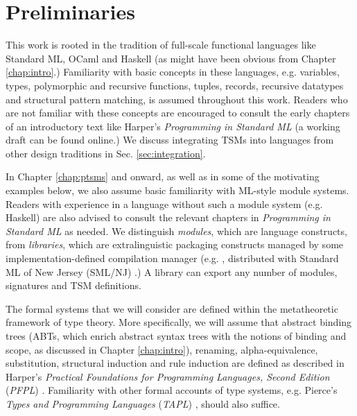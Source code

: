 
\section{Preliminaries}\label{sec:preliminaries}
\vspace{-3px}
This work is rooted in the tradition of full-scale functional languages like Standard ML, OCaml and Haskell (as might have been obvious from Chapter \ref{chap:intro}.) Familiarity with basic concepts in these languages, e.g. variables, types, polymorphic and recursive functions, tuples, records, recursive datatypes and structural pattern matching, is assumed throughout this work. Readers who are not familiar with these concepts are encouraged to consult the early chapters of an introductory text like Harper's \emph{Programming in Standard ML} \cite{harper1997programming} (a working draft can be found online.) We discuss integrating TSMs into languages from other design traditions in Sec. \ref{sec:integration}.

In Chapter \ref{chap:ptsms} and onward, as well as in some of the motivating examples below, we also assume basic familiarity with ML-style module systems. Readers with experience in a language without such a module system (e.g. Haskell) are also advised to consult the relevant chapters in \emph{Programming in Standard ML} \cite{harper1997programming} as needed. We distinguish \emph{modules}, which are language constructs, from \emph{libraries}, which are extralinguistic packaging constructs managed by some implementation-defined compilation manager (e.g. , distributed with Standard ML of New Jersey (SML/NJ) \cite{DBLP:conf/plilp/AppelM91}.) A library can export any number of modules, signatures and TSM definitions.

The formal systems that we will consider are defined within the metatheoretic framework of type theory. More specifically, we will assume that abstract binding trees (ABTs, which enrich abstract syntax trees with the notions of binding and scope, as discussed in Chapter \ref{chap:intro}), renaming, alpha-equivalence, substitution, structural induction and rule induction are defined as described in Harper's \emph{Practical Foundations for Programming Languages, Second Edition} (\emph{PFPL}) \cite{pfpl}. Familiarity with other formal accounts of type systems, e.g. Pierce's \emph{Types and Programming Languages} (\emph{TAPL}) \cite{tapl}, should also suffice.%

